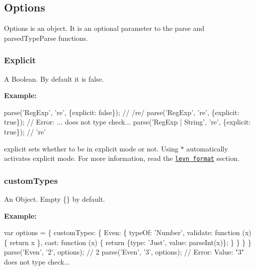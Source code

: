 \subsection*{Options}

Options is an object. It is an optional parameter to the {\ttfamily parse} and {\ttfamily parsed\+Type\+Parse} functions.

\subsubsection*{Explicit}

A {\ttfamily Boolean}. By default it is {\ttfamily false}.

{\bfseries Example\+:}


\begin{DoxyCode}
parse(\textcolor{stringliteral}{'RegExp'}, \textcolor{stringliteral}{'re'}, \{\textcolor{keyword}{explicit}: \textcolor{keyword}{false}\});          \textcolor{comment}{// /re/}
parse(\textcolor{stringliteral}{'RegExp'}, \textcolor{stringliteral}{'re'}, \{\textcolor{keyword}{explicit}: \textcolor{keyword}{true}\});           \textcolor{comment}{// Error: ... does not type check...}
parse(\textcolor{stringliteral}{'RegExp | String'}, \textcolor{stringliteral}{'re'}, \{\textcolor{keyword}{explicit}: \textcolor{keyword}{true}\});  \textcolor{comment}{// 're'}
\end{DoxyCode}


{\ttfamily explicit} sets whether to be in explicit mode or not. Using {\ttfamily $\ast$} automatically activates explicit mode. For more information, read the \href{#levn-format}{\tt levn format} section.

\subsubsection*{custom\+Types}

An {\ttfamily Object}. Empty {\ttfamily \{\}} by default.

{\bfseries Example\+:}


\begin{DoxyCode}
var options = \{
  customTypes: \{
    Even: \{
      typeOf: \textcolor{stringliteral}{'Number'},
      validate: \textcolor{keyword}{function} (x) \{
        \textcolor{keywordflow}{return} x %
      \},
      cast: \textcolor{keyword}{function} (x) \{
        \textcolor{keywordflow}{return} \{type: \textcolor{stringliteral}{'Just'}, value: parseInt(x)\};
      \}
    \}
  \}
\}
parse(\textcolor{stringliteral}{'Even'}, \textcolor{charliteral}{'2'}, options); \textcolor{comment}{// 2}
parse(\textcolor{stringliteral}{'Even'}, \textcolor{charliteral}{'3'}, options); \textcolor{comment}{// Error: Value: "3" does not type check...}
\end{DoxyCode}


